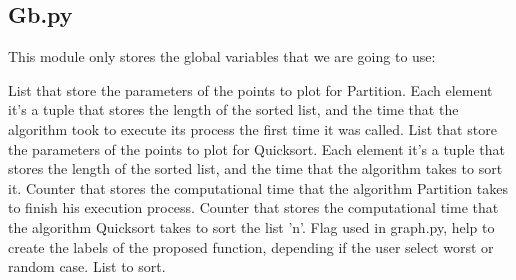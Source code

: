 \subsection{Gb.py}

This module only stores the global variables that we are going to use:

\begin{tasks}
 List that store the parameters of the points to plot for Partition. Each element it's a tuple that stores the length of the sorted list, and the time that the algorithm took to execute its process the first time it was called.
 List that store the parameters of the points to plot for Quicksort. Each element it's a tuple that stores the length of the sorted list, and the time that the algorithm takes to sort it.
 Counter that stores the computational time that the algorithm Partition takes to finish his execution process.
 Counter that stores the computational time that the algorithm Quicksort takes to sort the list 'n'.
 Flag used in graph.py, help to create the labels of the proposed function, depending if the user select worst or random case.
 List to sort.
\end{tasks}

\pagebreak